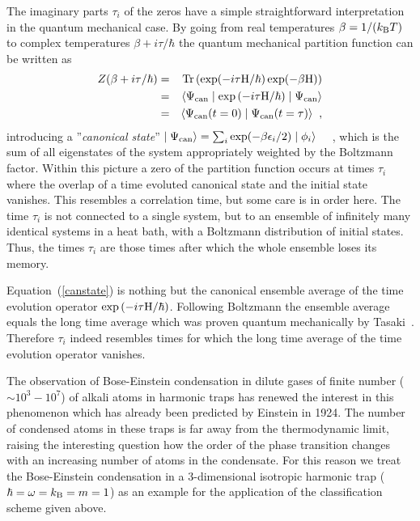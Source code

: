 

The imaginary parts  $\tau_i$ of the zeros have  a simple
straightforward interpretation in the quantum mechanical case. By going
from real temperatures $\beta=1/(k_{\rm B} T)$ to complex temperatures
$\beta + i \tau/\hbar$ the quantum mechanical partition function can be
written as
\begin{eqnarray}
Z(\beta+i \tau/\hbar)&=&{\rm Tr}\left( 
\exp(-i \tau {\rm H}/\hbar)
\exp(-\beta {\rm H}) \right) \label{canstate}\\
&=& \langle \Psi_{{\rm can}} \mid 
\exp\left(-i \tau {\rm H}/\hbar \right)
\mid \Psi_{{\rm can}} \rangle \\ 
&=& \langle \Psi_{{\rm can}}(t=0)\mid \Psi_{{\rm can}}(t=\tau) 
\rangle \;\;, \nonumber
\end{eqnarray}
introducing a ''{\sl canonical state}'' $\mid \Psi_{{\rm can}} \rangle = 
\sum_i \exp(-\beta\epsilon_i/2) \mid \phi_i \rangle \quad$ ,
which is  the sum of all eigenstates of the system appropriately
weighted by the Boltzmann factor.  Within this picture a zero of the
partition function occurs at times $\tau_i$ where the overlap of a time
evoluted canonical state and the initial state vanishes. This resembles
a correlation time, but some care is in order here. The time $\tau_i$ is
not connected to a single system, but to an ensemble of infinitely many
identical systems in a heat bath, with a Boltzmann distribution of
initial states.  Thus, the times $\tau_i$ are those times after which
the whole ensemble loses its memory. 

Equation~(\ref{canstate}) is nothing but the canonical ensemble average
of the time evolution operator $\exp\left(-i \tau {\rm H}/\hbar
\right)$. Following Boltzmann the ensemble average equals the long time
average which was proven quantum mechanically by
Tasaki~\cite{tasaki:1998}.  Therefore $\tau_i$ indeed resembles times
for which the long time average of the time evolution operator vanishes. 

The observation of Bose-Einstein condensation in dilute gases of finite
number ($ \sim 10^3-10^7$) of alkali atoms in harmonic traps
\cite{Anderson1995a} has renewed the interest in this phenomenon which
has already been predicted by Einstein \cite{Bose1924a} in 1924.  The
number of condensed atoms in these traps is far away from the
thermodynamic limit, raising the  interesting question how the order of
the phase transition changes with an increasing number of atoms in the
condensate. For this reason we treat the Bose-Einstein condensation in a
3-dimensional isotropic harmonic trap ($\hbar=\omega=k_{\rm B}=m=1$) as
an example for the application of the classification scheme given above.

